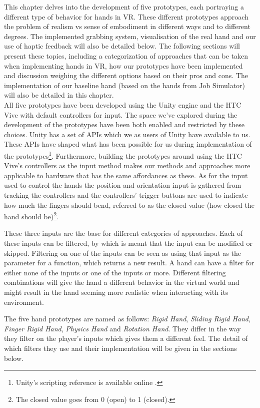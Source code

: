 This chapter delves into the development of five prototypes, each portraying a different type of behavior for hands in VR. These different prototypes approach the problem of realism vs sense of embodiment in different ways and to different degrees. The implemented grabbing system, visualisation of the real hand and our use of haptic feedback will also be detailed below. The following sections will present these topics, including a categorization of approaches that can be taken when implementing hands in VR, how our prototypes have been implemented and discussion weighing the different options based on their pros and cons. The implementation of our baseline hand (based on the hands from Job Simulator) will also be detailed in this chapter.\\

All five prototypes have been developed using the Unity engine and the HTC Vive with default controllers for input. The space we've explored during the development of the prototypes have been both enabled and restricted by these choices. Unity has a set of APIs which we as users of Unity have available to us. These APIs have shaped what has been possible for us during implementation of the prototypes\footnote{Unity's scripting reference is available online \parencite{UnityScriptingReference2017}.}. Furthermore, building the prototypes around using the HTC Vive's controllers as the input method makes our methods and approaches more applicable to hardware that has the same affordances as these. As for the input used to control the hands the position and orientation input is gathered from tracking the controllers and the controllers' trigger buttons are used to indicate how much the fingers should bend, referred to as the closed value (how closed the hand should be)\footnote{The closed value goes from 0 (open) to 1 (closed).}.

These three inputs are the base for different categories of approaches. Each of these inputs can be filtered, by which is meant that the input can be modified or skipped. Filtering on one of the inputs can be seen as using that input as the parameter for a function, which returns a new result. A hand can have a filter for either none of the inputs or one of the inputs or more. Different filtering combinations will give the hand a different behavior in the virtual world and might result in the hand seeming more realistic when interacting with its environment.

The five hand prototypes are named as follows: \textit{Rigid Hand}, \textit{Sliding Rigid Hand}, \textit{Finger Rigid Hand}, \textit{Physics Hand} and \textit{Rotation Hand}. They differ in the way they filter on the player's inputs which gives them a different feel. The detail of which filters they use and their implementation will be given in the sections below.

